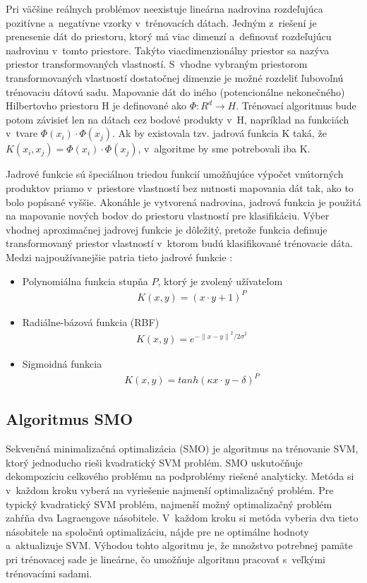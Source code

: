 Pri väčšine reálnych problémov neexistuje lineárna nadrovina rozdeľujúca pozitívne a~negatívne vzorky v~trénovacích dátach. Jedným z~riešení je prenesenie dát do priestoru, ktorý má viac dimenzí a~definovať rozdeľujúcu nadrovinu v~tomto priestore. Takýto viacdimenzionálny priestor sa nazýva priestor transformovaných vlastností. S~vhodne vybraným priestorom transformovaných vlastností dostatočnej dimenzie je možné rozdeliť ľubovoľnú trénovaciu dátovú sadu.
Mapovanie dát do iného (potencionálne nekonečného) Hilbertovho priestoru H je definované ako $\Phi:R^{d} \rightarrow H$. Trénovací algoritmus bude potom závisieť len na dátach cez bodové produkty v~H, napríklad na funkciách v~tvare $\Phi(x_{i})\cdot\Phi(x_{j})$. Ak by existovala tzv. jadrová funkcia K taká, že $K(x_{i},x_{j}) = \Phi(x_{i})\cdot\Phi(x_{j})$, v~algoritme by sme potrebovali iba K. 

Jadrové funkcie sú špeciálnou triedou funkcií umožňujúce výpočet vnútorných produktov priamo v~priestore vlastností bez nutnosti mapovania dát tak, ako to bolo popísané vyššie. 
Akonáhle je vytvorená nadrovina, jadrová funkcia je použitá na mapovanie nových bodov do priestoru vlastností pre klasifikáciu.
\newpage
Výber vhodnej aproximačnej jadrovej funkcie je dôležitý, pretože funkcia definuje transformovaný priestor vlastností v~ktorom budú klasifikované trénovacie dáta. Medzi najpoužívanejšie patria tieto jadrové funkcie \cite{alpaydin}: 
\begin{itemize}
	\item Polynomiálna funkcia stupňa $P$, ktorý je zvolený užívateľom
	\begin{align}
		 K(x,y) = (x \cdot y + 1)^{P}
	\end{align} 
	\item Radiálne-bázová funkcia (RBF) 
	\begin{align}
		K(x,y) = e^{- {\parallel x - y \parallel}^{2}/ {2\sigma}^{2}}
	\end{align}
	\item Sigmoidná funkcia
	\begin{align}
		K(x,y) = tanh (\kappa x \cdot y -\delta)^{P}
	\end{align}
\end{itemize}


\subsection{Algoritmus SMO}

Sekvenčná minimalizačná optimalizácia (SMO) \cite{smo} je algoritmus na trénovanie SVM, ktorý jednoducho rieši kvadratický SVM problém. SMO uskutočňuje dekompozíciu celkového problému na podproblémy riešené analyticky. Metóda si v~každom kroku vyberá na vyriešenie najmenší optimalizačný problém. Pre typický kvadratický SVM problém, najmenší možný optimalizačný problém zahŕňa dva Lagraengove násobitele. V~každom kroku si metóda vyberia dva tieto násobitele na spoločnú optimalizáciu, nájde pre ne optimálne hodnoty a~aktualizuje SVM. Výhodou tohto algoritmu je, že množstvo potrebnej pamäte pri trénovacej sade je lineárne, čo umožňuje algoritmu pracovať s~veľkými trénovacími sadami. 
 
